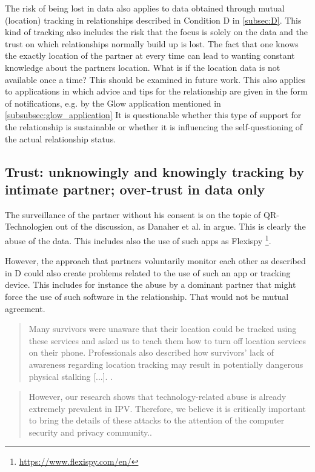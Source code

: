 The risk of being lost in data also applies to data obtained through mutual (location) tracking in relationships described in Condition D in \ref{subsec:D}. This kind of tracking also includes the risk that the focus is solely on the data and the trust on which relationships normally build up is lost. The fact that one knows the exactly location of the partner at every time can lead to wanting constant knowledge about the partners location. What is if the location data is not available once a time? This should be examined in future work.
This also applies to applications in which advice and tips for the relationship are given in the form of notifications, e.g. by the Glow application mentioned in \ref{subsubsec:glow_application} It is questionable whether this type of support for the relationship is sustainable or whether it is influencing the self-questioning of the actual relationship status.

\subsection{Trust: unknowingly and knowingly tracking by intimate partner; over-trust in data only}
The surveillance of the partner without his consent is on the topic of \acs{QR}-Technologien out of the discussion, as Danaher et al. in \cite{doi:10.1080/15265161.2017.1409823} argue. This is clearly the abuse of the data. This includes also the use of such apps as Flexispy \footnote{\url{https://www.flexispy.com/en/}}.

However, the approach that partners voluntarily monitor each other as described in D could also create problems related to the use of such an app or tracking device. This includes for instance the abuse by a dominant partner that might force the use of such software in the relationship. That would not be mutual agreement.
\begin{quote}
Many survivors were unaware that their location could be tracked using these services and asked us to teach them how to turn off location services on their phone. Professionals also described how survivors' lack of awareness regarding location tracking may result in potentially dangerous physical stalking [...]. \cite{freed2018stalker}.
\end{quote}
\begin{quote}
	However, our research shows that technology-related abuse is already extremely prevalent in IPV. Therefore, we believe it is critically important to bring the details of these attacks to the attention of the computer security and privacy community.\cite{freed2018stalker}.
\end{quote}

